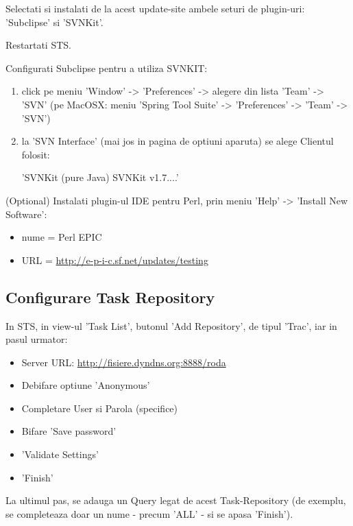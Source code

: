 Selectati si instalati de la acest update-site ambele seturi de plugin-uri:
'Subclipse' si 'SVNKit'.

Restartati STS.

Configurati Subclipse pentru a utiliza SVNKIT:
\begin{enumerate}
\item 
click pe meniu 'Window' -> 'Preferences' -> alegere din lista 'Team' -> 'SVN'
(pe MacOSX: meniu 'Spring Tool Suite' -> 'Preferences' -> 'Team' -> 'SVN')
\item
la 'SVN Interface' (mai jos in pagina de optiuni aparuta) se alege Clientul
folosit:

'SVNKit (pure Java) SVNKit v1.7....'
\end{enumerate}

(Optional) Instalati plugin-ul IDE pentru Perl, prin meniu 'Help' -> 
'Install New Software':
\begin{itemize}
\item 
nume = Perl EPIC
\item
URL = \url{http://e-p-i-c.sf.net/updates/testing}
\end{itemize}

\subsection{Configurare Task Repository}
In STS, in view-ul 'Task List', butonul 'Add Repository', de tipul 'Trac', 
iar in pasul urmator:
\begin{itemize}
\item 
Server URL:    \url{http://fisiere.dyndns.org:8888/roda}
\item
Debifare optiune 'Anonymous'
\item
Completare User si Parola (specifice)
\item
Bifare 'Save password'
\item
'Validate Settings'
\item
'Finish'
\end{itemize}

La ultimul pas, se adauga un Query legat de acest Task-Repository (de exemplu,
se completeaza doar un nume - precum 'ALL' - si se apasa 'Finish').


